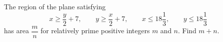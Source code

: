 The region of the plane satisfying
\[x\ge\dfrac y2+7,\qquad y\ge\dfrac x2+7,\qquad x\le18\dfrac13,\qquad y\le18\dfrac13\]
has area $\dfrac mn$ for relatively prime positive integers $m$ and $n$. Find $m+n$.
